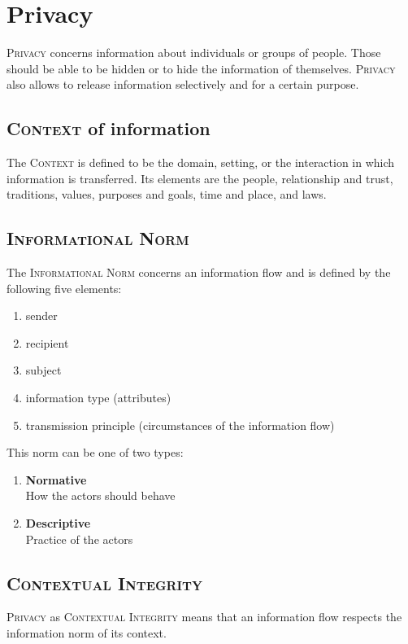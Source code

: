 \documentclass{report}
\begin{document}
	\chapter{Privacy}
	\textsc{Privacy} concerns information about individuals or groups of people. Those should be able to be hidden or to hide the information of themselves. \textsc{Privacy} also allows to release information selectively and for a certain purpose.
	\section{\textsc{Context} of information}
	\startsection
		The \textsc{Context} is defined to be the domain, setting, or the interaction in which information is transferred. Its elements are the people, relationship and trust, traditions, values, purposes and goals, time and place, and laws.
	\closesection
	\section{\textsc{Informational Norm}}
	\startsection
		The \textsc{Informational Norm} concerns an information flow and is defined by the following five elements:
		\begin{enumerate}[\textbullet]
			\item sender
			\item recipient
			\item subject
			\item information type (attributes)
			\item transmission principle (circumstances of the information flow)
		\end{enumerate}
		This norm can be one of two types:
		\begin{enumerate}
			\item \textbf{Normative} \\
			How the actors should behave
			\item \textbf{Descriptive} \\
			Practice of the actors
		\end{enumerate}
	\closesection
	\section{\textsc{Contextual Integrity}}
	\startsection
		\textsc{Privacy} as \textsc{Contextual Integrity} means that an information flow respects the information norm of its context.
	\closesection
	
	\hfill \\
	
\end{document}

